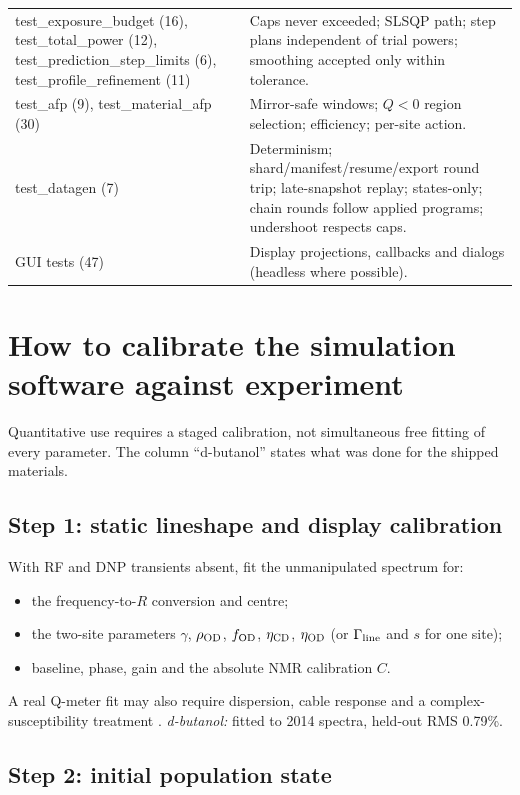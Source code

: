 \documentclass[11pt]{article}
\begin{document}
\begin{longtable}{L{0.36\textwidth} L{0.58\textwidth}}
test\_exposure\_budget (16), test\_total\_power (12), test\_prediction\_step\_limits (6), test\_profile\_refinement (11) & Caps never exceeded; SLSQP path; step plans independent of trial powers; smoothing accepted only within tolerance.\\
test\_afp (9), test\_material\_afp (30) & Mirror-safe windows; \(Q<0\) region selection; efficiency; per-site action.\\
test\_datagen (7) & Determinism; shard/manifest/resume/export round trip; late-snapshot replay; states-only; chain rounds follow applied programs; undershoot respects caps.\\
GUI tests (47) & Display projections, callbacks and dialogs (headless where possible).\\
\bottomrule
\end{longtable}

\section{How to calibrate the simulation software against experiment}
\label{sec:calibration}

Quantitative use requires a staged calibration, not simultaneous free fitting of every
parameter. The column ``d-butanol'' states what was done for the shipped materials.

\subsection{Step 1: static lineshape and display calibration}

With RF and DNP transients absent, fit the unmanipulated spectrum for:
\begin{itemize}
  \item the frequency-to-\(R\) conversion and centre;
  \item the two-site parameters \(\gamma\), \(\rho_{\rm OD}\), \(f_{\rm OD}\), \(\eta_{\rm CD}\), \(\eta_{\rm OD}\) (or \(\Gamma_{\rm line}\) and \(s\) for one site);
  \item baseline, phase, gain and the absolute NMR calibration \(C\).
\end{itemize}
A real Q-meter fit may also require dispersion, cable response and a complex-susceptibility
treatment \cite{ClementKeller2023,Keller2026}.
\emph{d-butanol:} fitted to 2014 spectra, held-out RMS 0.79\%.

\subsection{Step 2: initial population state}
\end{document}
